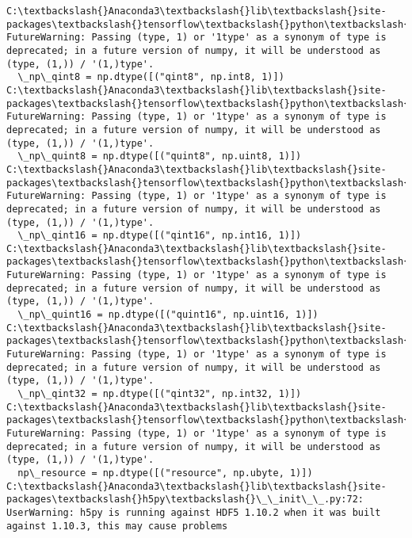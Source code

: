 \documentclass[11pt]{article}
\begin{document}
    \begin{Verbatim}[commandchars=\\\{\}]
C:\textbackslash{}Anaconda3\textbackslash{}lib\textbackslash{}site-packages\textbackslash{}tensorflow\textbackslash{}python\textbackslash{}framework\textbackslash{}dtypes.py:516: FutureWarning: Passing (type, 1) or '1type' as a synonym of type is deprecated; in a future version of numpy, it will be understood as (type, (1,)) / '(1,)type'.
  \_np\_qint8 = np.dtype([("qint8", np.int8, 1)])
C:\textbackslash{}Anaconda3\textbackslash{}lib\textbackslash{}site-packages\textbackslash{}tensorflow\textbackslash{}python\textbackslash{}framework\textbackslash{}dtypes.py:517: FutureWarning: Passing (type, 1) or '1type' as a synonym of type is deprecated; in a future version of numpy, it will be understood as (type, (1,)) / '(1,)type'.
  \_np\_quint8 = np.dtype([("quint8", np.uint8, 1)])
C:\textbackslash{}Anaconda3\textbackslash{}lib\textbackslash{}site-packages\textbackslash{}tensorflow\textbackslash{}python\textbackslash{}framework\textbackslash{}dtypes.py:518: FutureWarning: Passing (type, 1) or '1type' as a synonym of type is deprecated; in a future version of numpy, it will be understood as (type, (1,)) / '(1,)type'.
  \_np\_qint16 = np.dtype([("qint16", np.int16, 1)])
C:\textbackslash{}Anaconda3\textbackslash{}lib\textbackslash{}site-packages\textbackslash{}tensorflow\textbackslash{}python\textbackslash{}framework\textbackslash{}dtypes.py:519: FutureWarning: Passing (type, 1) or '1type' as a synonym of type is deprecated; in a future version of numpy, it will be understood as (type, (1,)) / '(1,)type'.
  \_np\_quint16 = np.dtype([("quint16", np.uint16, 1)])
C:\textbackslash{}Anaconda3\textbackslash{}lib\textbackslash{}site-packages\textbackslash{}tensorflow\textbackslash{}python\textbackslash{}framework\textbackslash{}dtypes.py:520: FutureWarning: Passing (type, 1) or '1type' as a synonym of type is deprecated; in a future version of numpy, it will be understood as (type, (1,)) / '(1,)type'.
  \_np\_qint32 = np.dtype([("qint32", np.int32, 1)])
C:\textbackslash{}Anaconda3\textbackslash{}lib\textbackslash{}site-packages\textbackslash{}tensorflow\textbackslash{}python\textbackslash{}framework\textbackslash{}dtypes.py:525: FutureWarning: Passing (type, 1) or '1type' as a synonym of type is deprecated; in a future version of numpy, it will be understood as (type, (1,)) / '(1,)type'.
  np\_resource = np.dtype([("resource", np.ubyte, 1)])
C:\textbackslash{}Anaconda3\textbackslash{}lib\textbackslash{}site-packages\textbackslash{}h5py\textbackslash{}\_\_init\_\_.py:72: UserWarning: h5py is running against HDF5 1.10.2 when it was built against 1.10.3, this may cause problems

\end{Verbatim}
\end{document}
